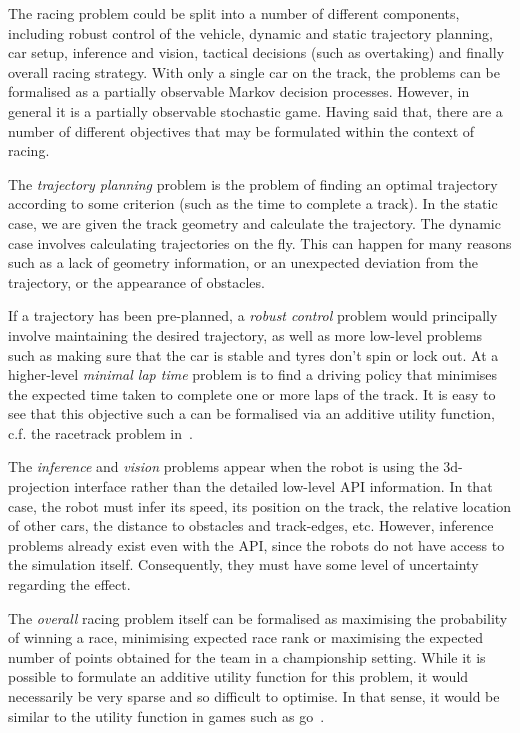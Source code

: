 \documentclass[a4paper]{article}
\begin{document}
The racing problem could be split into a number of different components, including robust control of the vehicle, dynamic and static trajectory planning, car setup, inference and vision, tactical decisions (such as overtaking) and finally overall racing strategy. With only a single car on the track, the problems can be formalised as a partially observable Markov decision processes. However, in general it is a partially observable stochastic game. Having said that, there are a number of different objectives that may be formulated within the context of racing.

The \emph{trajectory planning} problem is the problem of finding an optimal trajectory according to some criterion (such as the time to complete a track). In the static case, we are given the track geometry and calculate the trajectory. The dynamic case involves calculating trajectories on the fly. This can happen for many reasons such as a lack of geometry information,  or an unexpected deviation from the trajectory, or the appearance of obstacles. 

If a trajectory has been pre-planned, a \emph{robust control} problem would principally involve maintaining the desired trajectory, as well as more low-level problems such as making sure that the car is stable and tyres don't spin or lock out. At a higher-level \emph{minimal lap time} problem is to find a driving policy that minimises the expected time taken to complete one or more laps of the track. It is easy to see that this objective such a can be formalised via an additive utility function, c.f. the racetrack problem in~\cite{Sutton+Barto:1998}.

The \emph{inference} and \emph{vision} problems appear when the robot is using the 3d-projection interface rather than the detailed low-level API information. In that case, the robot must infer its speed, its position on the track, the relative location of other cars, the distance to obstacles and track-edges, etc. However, inference problems already exist even with the API, since the robots do not have access to the simulation itself. Consequently, they must have some level of uncertainty regarding the effect.

The \emph{overall} racing problem itself can be formalised as maximising the probability of winning a race, minimising expected race rank or maximising the expected number of points obtained for the team in a championship setting. While it is possible to formulate an additive utility function for this problem, it would necessarily be very sparse and so difficult to optimise. In that sense, it would be similar to the utility function in games such as go~\cite{gelly:uct-go}.
\end{document}
